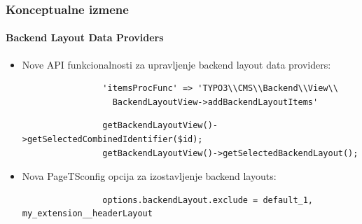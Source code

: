 \begin{frame}[fragile]
	\frametitle{Konceptualne izmene}
	\framesubtitle{Backend Layout Data Providers}

	\begin{itemize}
		\item Nove API funkcionalnosti za upravljenje backend layout data providers:

			\begin{lstlisting}
				'itemsProcFunc' => 'TYPO3\\CMS\\Backend\\View\\
				  BackendLayoutView->addBackendLayoutItems'
			\end{lstlisting}

			\begin{lstlisting}
				getBackendLayoutView()->getSelectedCombinedIdentifier($id);
				getBackendLayoutView()->getSelectedBackendLayout();
			\end{lstlisting}

		\item Nova PageTSconfig opcija za izostavljenje backend layouts:

			\begin{lstlisting}
				options.backendLayout.exclude = default_1, my_extension__headerLayout
			\end{lstlisting}

	\end{itemize}

\end{frame}


